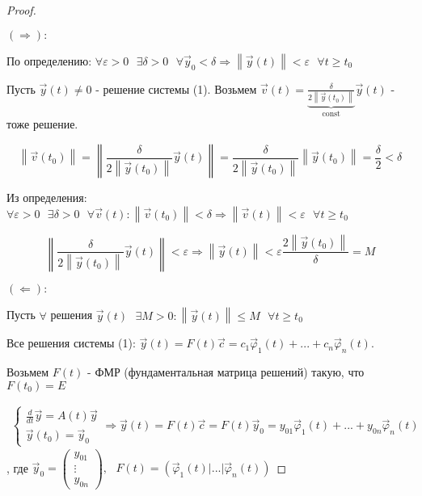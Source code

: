 \documentclass[12pt, a4paper]{report}
\begin{document}
\begin{proof} \(  \) 

    \( (\Rightarrow):\) 

    По определению: \( \forall  \varepsilon > 0 \text{ }  \exists  \delta > 0 \text{ }  \forall  \vec{y } _0 < \delta \Rightarrow \left\lVert \vec{y } (t) \right\rVert < \varepsilon \text{ }  \forall  t \ge  t_0 \) 


    Пусть \( \vec{y} (t ) \neq 0 \) - решение системы (1). Возьмем  \( \vec{v } (t ) =\displaystyle  \underbrace{\frac{\delta}{2 \left\lVert \vec{y } (t_0) \right\rVert }}_{\mathrm{const}   } \vec{y } ( t)  \) - тоже решение.

    \[ \left\lVert \vec{v} (t_0 ) \right\rVert  = \left\lVert \frac{ \delta }{2 \left\lVert \vec{y } (t_0 ) \right\rVert } \vec{y  } (t)  \right\rVert = \frac{ \delta }{2 \left\lVert \vec{y } (t_0) \right\rVert} \left\lVert \vec{y } (t_0) \right\rVert = \frac{\delta}{2 }  < \delta  \] 

    Из определения: \( \forall  \varepsilon > 0 \text{ } \exists  \delta > 0 \text{ }  \forall  \vec{v } (t ) : \left\lVert \vec{v }  (t_0) \right\rVert < \delta \Rightarrow \left\lVert \vec{v }  (t ) \right\rVert < \varepsilon \text{ }  \forall  t \ge  t_0 \) 

    \[ \left\lVert \frac{\delta }{2 \left\lVert  \vec{y } (t_0) \right\rVert } \vec{y } (t)  \right\rVert < \varepsilon \Rightarrow \left\lVert \vec{y } (t) \right\rVert < \varepsilon \frac{ 2 \left\lVert \vec{y } (t_0) \right\rVert}{\delta } = M  \] 

    \( (\Leftarrow): \) 

    Пусть \( \forall  \) решения \( \vec{y} (t ) \text{ } \exists  M > 0 : \left\lVert \vec{y } (t) \right\rVert \le  M \text{  } \forall  t \ge  t_0 \)  

    Все решения системы (1): \( \vec{y } (t ) = F(t ) \vec{c} = c_1 \vec{\varphi}_1 (t ) +... + c_n \vec{\varphi }_n(t)   \). 

    Возьмем \( F (t) \) - ФМР (фундаментальная матрица решений) такую, что \( F(t_0 ) = E\) 

    \[ \begin{aligned}
        \begin{cases}
            \displaystyle \frac{d}{dt }  \vec{ y } =   A(t )\vec{y } \\[5pt]
            \vec{y }  (t_0 )= \vec{y } _0
        \end{cases} 
        \Rightarrow \vec{y } (t ) = F(t ) \vec{c}= F(t ) \vec{y } _0 = y_{01} \vec{\varphi }_1 (t ) +...+ y_{0n }  \vec{\varphi }_n (t )   
    \end{aligned}\] 
    , где \( \displaystyle  \vec{y}_0 = \begin{pmatrix}
    y_{01}  \\
    \vdots\\
    y_{0n} 
    \end{pmatrix}, \text{ }  F(t ) = (\vec{\varphi }_1 (t ) |...|\vec{\varphi }_n(t)  )  \) 


\end{proof}
\end{document}
